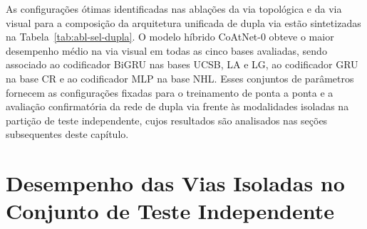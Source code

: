 As configurações ótimas identificadas nas ablações da via topológica e da via visual para a composição da arquitetura unificada de dupla via estão sintetizadas na Tabela~\ref{tab:abl-sel-dupla}. O modelo híbrido CoAtNet-0 obteve o maior desempenho médio na via visual em todas as cinco bases avaliadas, sendo associado ao codificador BiGRU nas bases UCSB, LA e LG, ao codificador GRU na base CR e ao codificador MLP na base NHL. Esses conjuntos de parâmetros fornecem as configurações fixadas para o treinamento de ponta a ponta e a avaliação confirmatória da rede de dupla via frente às modalidades isoladas na partição de teste independente, cujos resultados são analisados nas seções subsequentes deste capítulo.

\begin{table}[htb]
\centering
\caption{Configurações ótimas selecionadas nas ablações para a composição da rede de dupla via em cada conjunto de dados.}
\label{tab:abl-sel-dupla}
\label{tab:abl-top-sel}
\small
{}
\end{table}

\section{Desempenho das Vias Isoladas no Conjunto de Teste Independente}
\label{sec:res-vias-isoladas}

